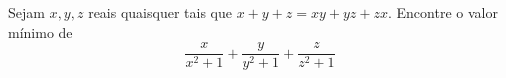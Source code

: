 Sejam $x, y, z$ reais quaisquer tais que $x + y + z = xy + yz + zx$. Encontre o valor mínimo de
$$\frac{x}{x^2+1} + \frac{y}{y^2+1} + \frac{z}{z^2+1}$$